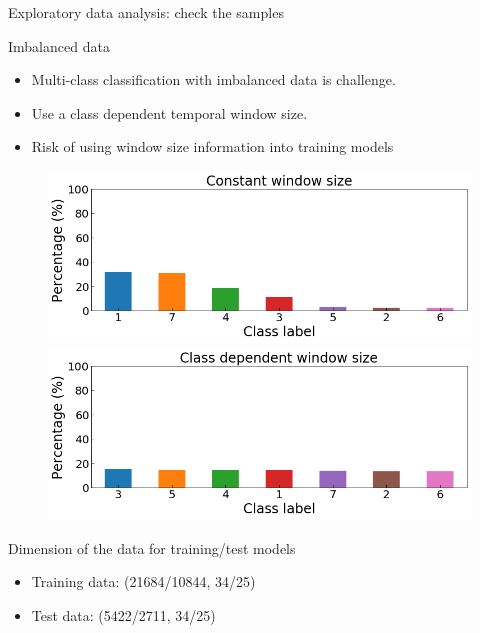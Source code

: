 \documentclass{if-beamer}
\begin{document}
\begin{frame}{Exploratory data analysis: check the samples}
        \begin{block}{Imbalanced data}    
        \begin{itemize}
                \item Multi-class classification with imbalanced data is challenge. 
                \item Use a class dependent temporal window size.
                \item \alert{Risk of using window size information into training models}
        \end{itemize}                 
        
            	 \begin{figure}
                    \includegraphics[scale=0.18]{./figs/percentage_origin.png}
                    \includegraphics[scale=0.18]{./figs/percentage_balanced.png} 
                    \end{figure} 
   	 \end{block}
	
	\begin{block}{Dimension of the data for training/test models}  
	\begin{itemize}
            \item  Training data:  (21684/10844, 34/25)
            \item Test data:  (5422/2711, 34/25) 
            \end{itemize}
        \end{block}

\end{frame}
\end{document}
